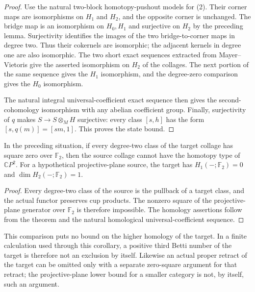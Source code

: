 \begin{proof}
Use the natural two-block homotopy-pushout models for (2).
Their corner maps are isomorphisms on $H_1$ and $H_2$,
and the opposite corner is unchanged.  The bridge map is
an isomorphism on $H_0,H_1$ and surjective on $H_2$ by
the preceding lemma.  Surjectivity identifies the images
of the two bridge-to-corner maps in degree two.  Thus their
cokernels are isomorphic; the adjacent kernels in degree
one are also isomorphic.  The two short exact sequences
extracted from Mayer--Vietoris give the asserted isomorphism
on $H_2$ of the collages.  The next portion of the same
sequence gives the $H_1$ isomorphism, and the degree-zero
comparison gives the $H_0$ isomorphism.

The natural integral universal-coefficient exact sequence
then gives the second-cohomology isomorphism with any
abelian coefficient group.  Finally, surjectivity of $q$
makes $S\to S\otimes_M H$ surjective: every class $[s,h]$
has the form $[s,q(m)]=[sm,1]$.  This proves the state bound.
\end{proof}

\begin{corollary}
\label{CP2:A-band-quotient-modtwo-square-transfer}
In the preceding situation, if every degree-two class of
the target collage has square zero over $\mathbb F_2$, then
the source collage cannot have the homotopy type of
$\mathbb CP^2$.
For a hypothetical projective-plane source, the target has
$H_1(-;\mathbb F_2)=0$ and
$\dim H_2(-;\mathbb F_2)=1$.
\end{corollary}
\begin{proof}
Every degree-two class of the source is the pullback of a
target class, and the actual functor preserves cup products.
The nonzero square of the projective-plane generator over
$\mathbb F_2$ is therefore impossible.  The homology
assertions follow from the theorem and the natural
homological universal-coefficient sequence.
\end{proof}

This comparison puts no bound on the higher homology of
the target.  In a finite calculation used through this
corollary, a positive third Betti number of the target is
therefore not an exclusion by itself.  Likewise an actual
proper retract of the target can be omitted only with a
separate zero-square argument for that retract; the
projective-plane lower bound for a smaller category is
not, by itself, such an argument.
